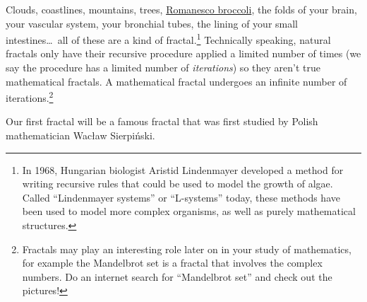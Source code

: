 Clouds, coastlines, mountains, trees, 
\href{https://www.google.com/search?q="romanesco+broccoli"&tbm=isch}{Romanesco broccoli}, 
the folds of your brain, your vascular system, your bronchial tubes, the lining of your small intestines\ldots\ all of these are a kind of fractal.\footnote{In 1968, Hungarian biologist Aristid Lindenmayer developed a method for writing recursive rules that could be used to model the growth of algae. Called ``Lindenmayer systems'' or ``L-systems'' today, these methods have been used to model more complex organisms, as well as purely mathematical structures.} Technically speaking, natural fractals only have their recursive procedure applied a limited number of times (we say the procedure has a limited number of \textit{iterations}) so they aren't true mathematical fractals. A mathematical fractal undergoes an infinite number of iterations.\footnote{Fractals may play an interesting role later on in your study of mathematics, for example the Mandelbrot set is a fractal that involves the complex numbers. Do an internet search for ``Mandelbrot set'' and check out the pictures!}

Our first fractal will be a famous fractal that was first studied by Polish mathematician Wac{\l}aw Sierpi\'nski.


